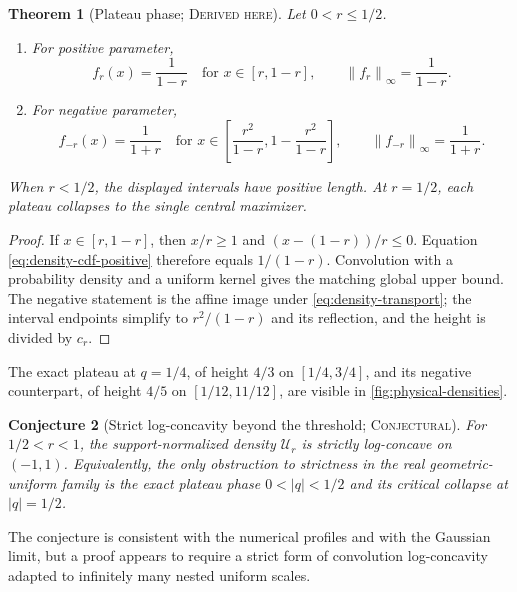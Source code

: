 \documentclass[11pt,oneside]{article}
\newtheorem{theorem}{Theorem}[section]
\newtheorem{conjecture}[theorem]{Conjecture}
\theoremstyle{definition}
\theoremstyle{remark}
\newcommand{\norm}[1]{\left\lVert#1\right\rVert}
\newcommand{\Derived}{\textsc{Derived here}}
\newcommand{\Conjectural}{\textsc{Conjectural}}
\begin{document}
\begin{theorem}[Plateau phase; \Derived]\label{thm:plateau}
Let \(0<r\le1/2\).
\begin{enumerate}
\item For positive parameter,
\begin{equation}\label{eq:positive-plateau}
 f_r(x)=\frac1{1-r}\quad\text{for }x\in[r,1-r],
 \qquad
 \norm{f_r}_\infty=\frac1{1-r}.
\end{equation}
\item For negative parameter,
\begin{equation}\label{eq:negative-plateau}
 f_{-r}(x)=\frac1{1+r}
 \quad\text{for }
 x\in\left[\frac{r^2}{1-r},1-\frac{r^2}{1-r}\right],
 \qquad
 \norm{f_{-r}}_\infty=\frac1{1+r}.
\end{equation}
\end{enumerate}
When \(r<1/2\), the displayed intervals have positive length.  At
\(r=1/2\), each plateau collapses to the single central maximizer.
\end{theorem}

\begin{proof}
If \(x\in[r,1-r]\), then \(x/r\ge1\) and
\((x-(1-r))/r\le0\).  Equation \eqref{eq:density-cdf-positive} therefore equals
\(1/(1-r)\).  Convolution with a probability density and a uniform kernel gives
the matching global upper bound.  The negative statement is the affine image
under \eqref{eq:density-transport}; the interval endpoints simplify to
\(r^2/(1-r)\) and its reflection, and the height is divided by \(c_r\).
\end{proof}

The exact plateau at \(q=1/4\), of height \(4/3\) on \([1/4,3/4]\), and its
negative counterpart, of height \(4/5\) on \([1/12,11/12]\), are visible in
\cref{fig:physical-densities}.

\begin{conjecture}[Strict log-concavity beyond the threshold; \Conjectural]
For \(1/2<r<1\), the support-normalized density \(\mathcal U_r\) is strictly
log-concave on \((-1,1)\).  Equivalently, the only obstruction to strictness in
the real geometric-uniform family is the exact plateau phase
\(0<|q|<1/2\) and its critical collapse at \(|q|=1/2\).
\end{conjecture}

The conjecture is consistent with the numerical profiles and with the Gaussian
limit, but a proof appears to require a strict form of convolution
log-concavity adapted to infinitely many nested uniform scales.
\end{document}
